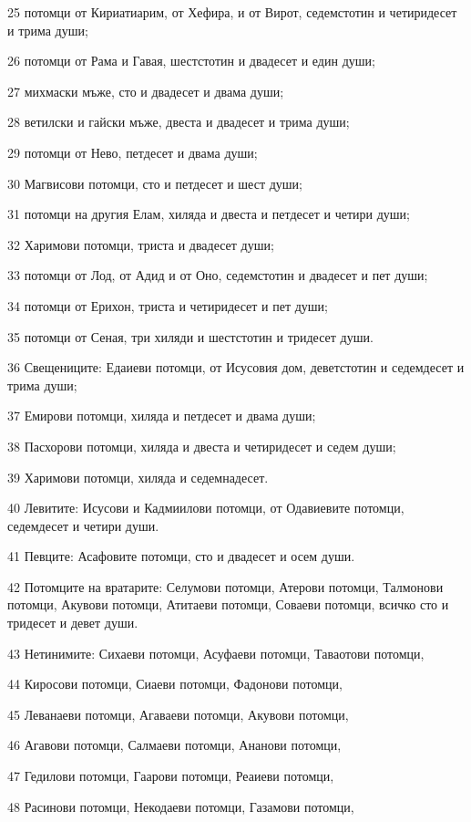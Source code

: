 \par 25 потомци от Кириатиарим, от Хефира, и от Вирот, седемстотин и четиридесет и трима души;
\par 26 потомци от Рама и Гавая, шестстотин и двадесет и един души;
\par 27 михмаски мъже, сто и двадесет и двама души;
\par 28 ветилски и гайски мъже, двеста и двадесет и трима души;
\par 29 потомци от Нево, петдесет и двама души;
\par 30 Магвисови потомци, сто и петдесет и шест души;
\par 31 потомци на другия Елам, хиляда и двеста и петдесет и четири души;
\par 32 Харимови потомци, триста и двадесет души;
\par 33 потомци от Лод, от Адид и от Оно, седемстотин и двадесет и пет души;
\par 34 потомци от Ерихон, триста и четиридесет и пет души;
\par 35 потомци от Сеная, три хиляди и шестстотин и тридесет души.
\par 36 Свещениците: Едаиеви потомци, от Исусовия дом, деветстотин и седемдесет и трима души;
\par 37 Емирови потомци, хиляда и петдесет и двама души;
\par 38 Пасхорови потомци, хиляда и двеста и четиридесет и седем души;
\par 39 Харимови потомци, хиляда и седемнадесет.
\par 40 Левитите: Исусови и Кадмиилови потомци, от Одавиевите потомци, седемдесет и четири души.
\par 41 Певците: Асафовите потомци, сто и двадесет и осем души.
\par 42 Потомците на вратарите: Селумови потомци, Атерови потомци, Талмонови потомци, Акувови потомци, Атитаеви потомци, Соваеви потомци, всичко сто и тридесет и девет души.
\par 43 Нетинимите: Сихаеви потомци, Асуфаеви потомци, Таваотови потомци,
\par 44 Киросови потомци, Сиаеви потомци, Фадонови потомци,
\par 45 Леванаеви потомци, Агаваеви потомци, Акувови потомци,
\par 46 Агавови потомци, Салмаеви потомци, Ананови потомци,
\par 47 Гедилови потомци, Гаарови потомци, Реаиеви потомци,
\par 48 Расинови потомци, Некодаеви потомци, Газамови потомци,
